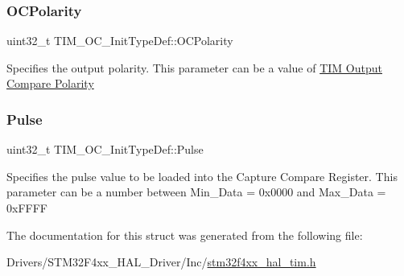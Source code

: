\subsubsection{\texorpdfstring{O\+C\+Polarity}{OCPolarity}}
{\footnotesize\ttfamily uint32\+\_\+t T\+I\+M\+\_\+\+O\+C\+\_\+\+Init\+Type\+Def\+::\+O\+C\+Polarity}

Specifies the output polarity. This parameter can be a value of \hyperlink{group___t_i_m___output___compare___polarity}{T\+IM Output Compare Polarity} \mbox{\label{struct_t_i_m___o_c___init_type_def_a61fb5b9ef4154de67620ac81085a0e39}} 
\subsubsection{\texorpdfstring{Pulse}{Pulse}}
{\footnotesize\ttfamily uint32\+\_\+t T\+I\+M\+\_\+\+O\+C\+\_\+\+Init\+Type\+Def\+::\+Pulse}

Specifies the pulse value to be loaded into the Capture Compare Register. This parameter can be a number between Min\+\_\+\+Data = 0x0000 and Max\+\_\+\+Data = 0x\+F\+F\+FF 

The documentation for this struct was generated from the following file\+:\begin{DoxyCompactItemize}
\item 
Drivers/\+S\+T\+M32\+F4xx\+\_\+\+H\+A\+L\+\_\+\+Driver/\+Inc/\hyperlink{stm32f4xx__hal__tim_8h}{stm32f4xx\+\_\+hal\+\_\+tim.\+h}\end{DoxyCompactItemize}
